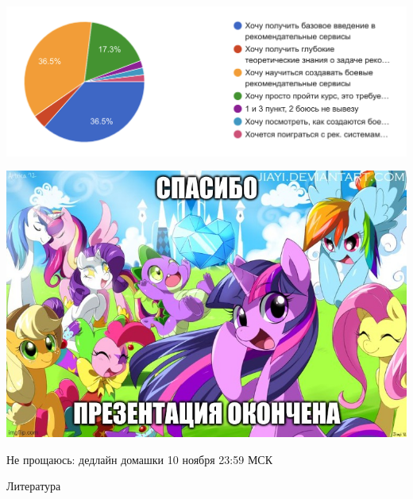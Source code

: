 \documentclass[11pt,aspectratio=169]{beamer}
\begin{document}
\begin{frame}

\begin{center}
\includegraphics[scale=0.5]{images/poll.png}
\end{center}

\end{frame}

\begin{frame}

\begin{center}
\includegraphics[scale=0.4]{images/thankyou.jpeg}

Не прощаюсь: дедлайн домашки 10 ноября 23:59 МСК
\end{center}

\end{frame}

\begin{frame}[allowframebreaks]{Литература}




\end{frame}
\end{document}
